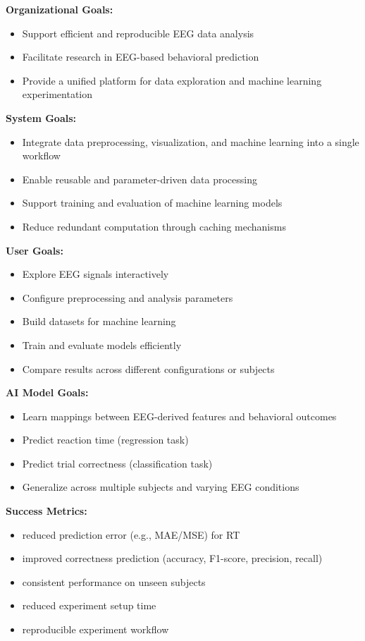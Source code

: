 \noindent\textbf{Organizational Goals:}
\begin{itemize}
    \item Support efficient and reproducible EEG data analysis
    \item Facilitate research in EEG-based behavioral prediction
    \item Provide a unified platform for data exploration and machine learning experimentation
\end{itemize}

\noindent\textbf{System Goals:}
\begin{itemize}
    \item Integrate data preprocessing, visualization, and machine learning into a single workflow
    \item Enable reusable and parameter-driven data processing
    \item Support training and evaluation of machine learning models
    \item Reduce redundant computation through caching mechanisms
\end{itemize}

\noindent\textbf{User Goals:}
\begin{itemize}
    \item Explore EEG signals interactively
    \item Configure preprocessing and analysis parameters
    \item Build datasets for machine learning
    \item Train and evaluate models efficiently
    \item Compare results across different configurations or subjects
\end{itemize}

\noindent\textbf{AI Model Goals:}
\begin{itemize}
    \item Learn mappings between EEG-derived features and behavioral outcomes
    \item Predict reaction time (regression task)
    \item Predict trial correctness (classification task)
    \item Generalize across multiple subjects and varying EEG conditions
\end{itemize}

\vspace{0.5em}
\noindent\textbf{Success Metrics:}
\begin{itemize}
    \item reduced prediction error (e.g., MAE/MSE) for RT
    \item improved correctness prediction (accuracy, F1-score, precision, recall)
    \item consistent performance on unseen subjects
    \item reduced experiment setup time
    \item reproducible experiment workflow
\end{itemize}


